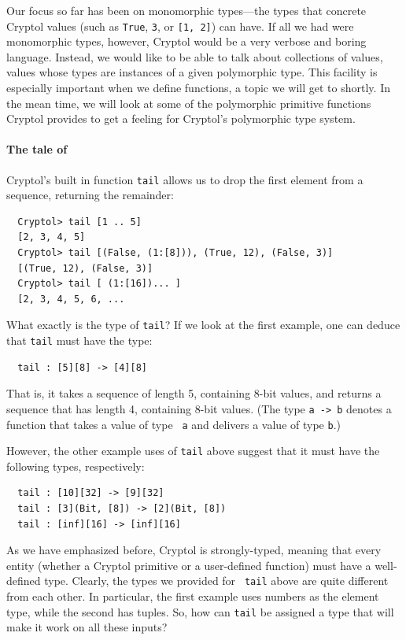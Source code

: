 Our focus so far has been on monomorphic types---the types that
concrete Cryptol values (such as {\tt True}, {\tt 3}, or {\tt [1, 2]})
can have.  If all we had were monomorphic types, however, Cryptol
would be a very verbose and boring language.  Instead, we would like
to be able to talk about collections of values, values whose types are
instances of a given polymorphic type. This facility is especially
important when we define functions, a topic we will get to shortly. In
the mean time, we will look at some of the polymorphic primitive
functions Cryptol provides to get a feeling for Cryptol's polymorphic
type system.

\paragraph{The tale of {}}\indTail
Cryptol's built in function {\tt tail} allows us to drop the first
element from a sequence, returning the remainder:
\begin{Verbatim}
  Cryptol> tail [1 .. 5]
  [2, 3, 4, 5]
  Cryptol> tail [(False, (1:[8])), (True, 12), (False, 3)]
  [(True, 12), (False, 3)]
  Cryptol> tail [ (1:[16])... ]
  [2, 3, 4, 5, 6, ...
\end{Verbatim}
What exactly is the type of {\tt tail}? If we look at the first
example, one can deduce that {\tt tail} must have the type:
\begin{Verbatim}
  tail : [5][8] -> [4][8]
\end{Verbatim}
That is, it takes a sequence of length 5, containing 8-bit values, and
returns a sequence that has length 4, containing 8-bit values. (The
type {\tt a -> b} denotes a function that takes a value of type {\tt
  a} and delivers a value of type {\tt b}.)

However, the other example uses of {\tt tail} above suggest that it
must have the following types, respectively:
\begin{Verbatim}
  tail : [10][32] -> [9][32]
  tail : [3](Bit, [8]) -> [2](Bit, [8])
  tail : [inf][16] -> [inf][16]
\end{Verbatim}

As we have emphasized before, Cryptol is strongly-typed, meaning that
every entity (whether a Cryptol primitive or a user-defined function)
must have a well-defined type. Clearly, the types we provided for {\tt
  tail} above are quite different from each other. In particular, the
first example uses numbers as the element type, while the second has
tuples. So, how can {\tt tail} be assigned a type that will make it
work on all these inputs?

